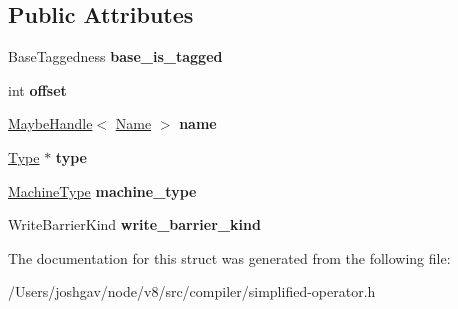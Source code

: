 \subsection*{Public Attributes}
\begin{DoxyCompactItemize}
\item 
Base\+Taggedness {\bfseries base\+\_\+is\+\_\+tagged}\hypertarget{structv8_1_1internal_1_1compiler_1_1_field_access_a80ad92a6cfa655dda1200a93561a1ec3}{}\label{structv8_1_1internal_1_1compiler_1_1_field_access_a80ad92a6cfa655dda1200a93561a1ec3}

\item 
int {\bfseries offset}\hypertarget{structv8_1_1internal_1_1compiler_1_1_field_access_a5aaeb277363ca55ed97b67ff81355932}{}\label{structv8_1_1internal_1_1compiler_1_1_field_access_a5aaeb277363ca55ed97b67ff81355932}

\item 
\hyperlink{classv8_1_1internal_1_1_maybe_handle}{Maybe\+Handle}$<$ \hyperlink{classv8_1_1internal_1_1_name}{Name} $>$ {\bfseries name}\hypertarget{structv8_1_1internal_1_1compiler_1_1_field_access_af468636011578748fa656ff0814b1948}{}\label{structv8_1_1internal_1_1compiler_1_1_field_access_af468636011578748fa656ff0814b1948}

\item 
\hyperlink{classv8_1_1internal_1_1_type}{Type} $\ast$ {\bfseries type}\hypertarget{structv8_1_1internal_1_1compiler_1_1_field_access_a643f0ae0d7dd43cecf2afdd147f474d0}{}\label{structv8_1_1internal_1_1compiler_1_1_field_access_a643f0ae0d7dd43cecf2afdd147f474d0}

\item 
\hyperlink{classv8_1_1internal_1_1_machine_type}{Machine\+Type} {\bfseries machine\+\_\+type}\hypertarget{structv8_1_1internal_1_1compiler_1_1_field_access_a720527577f74f00072701e8b997d014b}{}\label{structv8_1_1internal_1_1compiler_1_1_field_access_a720527577f74f00072701e8b997d014b}

\item 
Write\+Barrier\+Kind {\bfseries write\+\_\+barrier\+\_\+kind}\hypertarget{structv8_1_1internal_1_1compiler_1_1_field_access_ace3dcf509114b187c43c31b10f1eac7b}{}\label{structv8_1_1internal_1_1compiler_1_1_field_access_ace3dcf509114b187c43c31b10f1eac7b}

\end{DoxyCompactItemize}


The documentation for this struct was generated from the following file\+:\begin{DoxyCompactItemize}
\item 
/\+Users/joshgav/node/v8/src/compiler/simplified-\/operator.\+h\end{DoxyCompactItemize}
